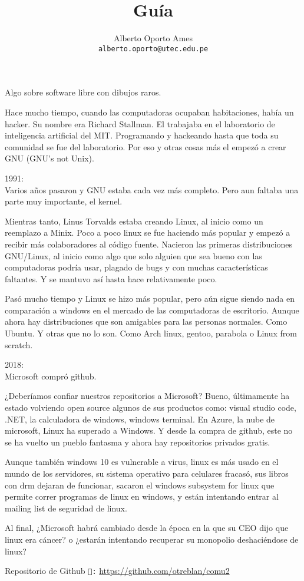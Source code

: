 \documentclass[12pt]{article}
\title{\textbf{Guía}}
\author{
		Alberto Oporto Ames\\
		\texttt{alberto.oporto@utec.edu.pe}
		}
\begin{document}
\maketitle
\thispagestyle{fancy}

Algo sobre software libre con dibujos raros.

Hace mucho tiempo, cuando las computadoras ocupaban habitaciones, había un hacker.
Su nombre era Richard Stallman.
El trabajaba en el laboratorio de inteligencia artificial del MIT.
Programando y hackeando hasta que toda su comunidad se fue del laboratorio.
Por eso y otras cosas más el empezó a crear GNU (GNU's not Unix).

1991:\\
Varios años pasaron y GNU estaba cada vez más completo.
Pero aun faltaba una parte muy importante, el kernel.

Mientras tanto, Linus Torvalds estaba creando Linux, al inicio como un reemplazo a Minix.
Poco a poco linux se fue haciendo más popular y empezó a recibir más colaboradores al código fuente.
Nacieron las primeras distribuciones GNU/Linux, al inicio como algo que solo alguien que sea bueno con las computadoras podría usar,
plagado de bugs y con muchas características faltantes.
Y se mantuvo así hasta hace relativamente poco.

Pasó mucho tiempo y Linux se hizo más popular,
pero aún sigue siendo nada en comparación a windows en el mercado de las computadoras de escritorio.
Aunque ahora hay distribuciones que son amigables para las personas normales.
Como Ubuntu.
Y otras que no lo son.
Como Arch linux, gentoo, parabola o Linux from scratch.

2018:\\
Microsoft compró github.

¿Deberíamos confiar nuestros repositorios a Microsoft?
Bueno, últimamente ha estado volviendo open source algunos de sus productos como: visual studio code, .NET, la calculadora de windows, windows terminal.
En Azure, la nube de microsoft, Linux ha superado a Windows.
Y desde la compra de github, este no se ha vuelto un pueblo fantasma y ahora hay repositorios privados gratis.

Aunque también windows 10 es vulnerable a virus,
linux es más usado en el mundo de los servidores,
su sistema operativo para celulares fracasó,
sus libros con drm dejaran de funcionar,
sacaron el windows subsystem for linux que permite correr programas de linux en windows,
y están intentando entrar al mailing list de seguridad de linux.

Al final, ¿Microsoft habrá cambiado desde la época en la que su CEO dijo que linux era cáncer?
o ¿estarán intentando recuperar su monopolio deshaciéndose de linux?

\vfill
Repositorio de Github \texttt{:} \url{https://github.com/otreblan/comu2}
\end{document}
